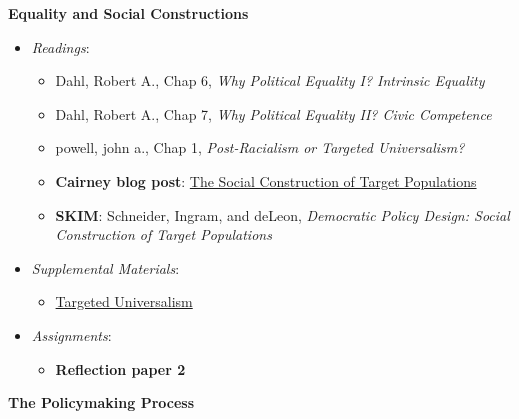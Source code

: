 \week \textbf{Equality and Social Constructions}

\begin{itemize}

\item
  \emph{Readings}:

  \begin{itemize}
  
  \item
    Dahl, Robert A., Chap 6, \emph{Why Political Equality I? Intrinsic
    Equality}
  \item
    Dahl, Robert A., Chap 7, \emph{Why Political Equality II? Civic
    Competence}
  \item
    powell, john a., Chap 1, \emph{Post-Racialism or Targeted
    Universalism?}
  \item
    \textbf{Cairney blog post}:
    \href{https://paulcairney.wordpress.com/2016/01/08/policy-concepts-in-1000-words-the-social-construction-of-target-populations/}{The
    Social Construction of Target Populations}
  \item
    \textbf{SKIM}: Schneider, Ingram, and deLeon, \emph{Democratic
    Policy Design: Social Construction of Target Populations}
  \end{itemize}
\item
  \emph{Supplemental Materials}:

  \begin{itemize}
  
  \item
    \faYoutube \hspace{0.005in}
    \href{https://youtu.be/a0At2xbQB7w}{Targeted Universalism}
  \end{itemize}
\item
  \emph{Assignments}:

  \begin{itemize}
  
  \item
    \textbf{Reflection paper 2}
  \end{itemize}
\end{itemize}

\week \textbf{The Policymaking Process}

